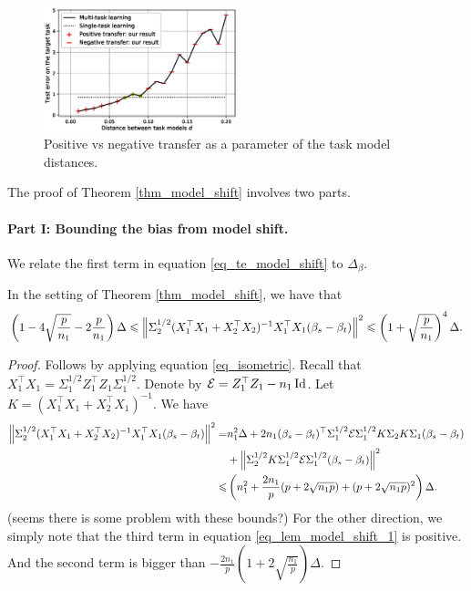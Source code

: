 \begin{figure}
	\centering
	\includegraphics[width=0.5\textwidth]{figures/model_shift_phase_transition.eps}
	\caption{Positive vs negative transfer as a parameter of the task model distances.}
	\label{fig_model_shift_phasetrans}
\end{figure}

\begin{example}
\end{example}

\medskip
The proof of Theorem \ref{thm_model_shift} involves two parts.

\paragraph{Part I: Bounding the bias from model shift.}
We relate the first term in equation \eqref{eq_te_model_shift} to $\Delta_{\beta}$.
\begin{proposition}\label{prop_model_shift}
	In the setting of Theorem \ref{thm_model_shift}, we have that
	\begin{align*}
		\left({1 - {4\sqrt{\frac{p}{n_1}}} - {2\frac{p}{n_1}}}\right) \Delta
		\leqslant \left\| \Sigma_2^{1/2} (X_1^{\top}X_1 + X_2^{\top}X_2)^{-1}X_1^{\top}X_1(\beta_s - \beta_t) \right\|^2
		\leqslant \left({1 + \sqrt{\frac{p}{n_1}}}\right)^4 \Delta.
	\end{align*}
\end{proposition}

\begin{proof}
	Follows by applying equation \eqref{eq_isometric}.
	Recall that $X_1^{\top}X_1 = \Sigma_1^{1/2}Z_1^{\top}Z_1\Sigma_1^{1/2}$.
	Denote by $\mathcal{E} = Z_1^{\top}Z_1 - {n_1}\operatorname{Id}$.
	Let $K = (X_1^{\top}X_1 + X_2^{\top}X_1)^{-1}$.
	We have
	\begin{align}
		\left\| \Sigma_2^{1/2}(X_1^{\top}X_1 + X_2^{\top}X_2)^{-1}X_1^{\top}X_1(\beta_s - \beta_t) \right\|^2
		= &{n_1^2}{}\Delta + {2n_1}(\beta_s - \beta_t)^{\top}\Sigma_1^{1/2}\mathcal{E}\Sigma_1^{1/2}K \Sigma_2 K \Sigma_1 (\beta_s - \beta_t) \\
		&+ \left\| \Sigma_2^{1/2} K \Sigma_1^{1/2}\mathcal{E} \Sigma_1^{1/2}(\beta_s - \beta_t) \right\|^2 \label{eq_lem_model_shift_1}\\
		\leqslant& \left({{n_1^2}{} + \frac{2n_1}p(p + 2\sqrt{{n_1}p}) + (p + 2\sqrt{{n_1}p})^2}\right) \Delta. \nonumber
	\end{align}
{\cob(seems there is some problem with these bounds?)}	For the other direction, we simply note that the third term in equation \eqref{eq_lem_model_shift_1} is positive.
	And the second term is bigger than $-\frac{2n_1}p(1 + 2\sqrt{\frac{n_1}p}) \Delta$.
\end{proof}


